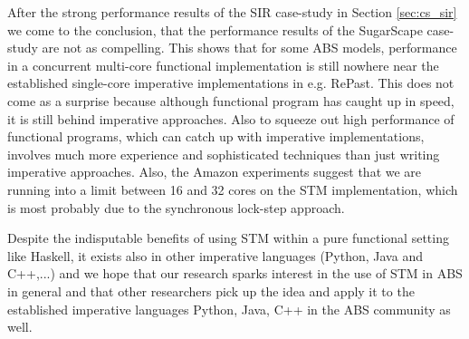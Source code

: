 After the strong performance results of the SIR case-study in Section \ref{sec:cs_sir} we come to the conclusion, that the performance results of the SugarScape case-study are not as compelling. This shows that for some ABS models, performance in a concurrent multi-core functional implementation is still nowhere near the established single-core imperative implementations in e.g. RePast. This does not come as a surprise because although functional program has caught up in speed, it is still behind imperative approaches. Also to squeeze out high performance of functional programs, which can catch up with imperative implementations, involves much more experience and sophisticated techniques than just writing imperative approaches.
Also, the Amazon experiments suggest that we are running into a limit between 16 and 32 cores on the STM implementation, which is most probably due to the synchronous lock-step approach.

Despite the indisputable benefits of using STM within a pure functional setting like Haskell, it exists also in other imperative languages (Python, Java and C++,...) and we hope that our research sparks interest in the use of STM in ABS in general and that other researchers pick up the idea and apply it to the established imperative languages Python, Java, C++ in the ABS community as well.